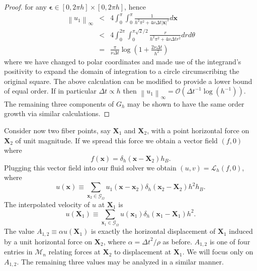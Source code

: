 \documentclass[preprint,12pt]{elsarticle}
\newcommand{\norm}[1]{\left\lVert#1\right\rVert}
\begin{document}
\begin{proof}
for any $\mathbf{\epsilon} \in [0,2\pi h]\times[0,2\pi h]$, hence 
\begin{eqnarray}
\norm{u_1}_\infty
&<&
4\int_0^{\pi}\int_0^{\pi}
\frac{1}{h^2\pi^2 + 4\nu\Delta t|\mathbf{x}|^2}
d\mathbf{x} \\
&<&
4\int_0^{2\pi}\int_0^{\pi\sqrt{2}/2}
\frac{r}{h^2\pi^2 + 4\nu\Delta t r^2}
drd\theta \\
&=&
\frac{\pi}{\nu\Delta t} \log\left( 1 + \frac{2\nu\Delta t}{h^2} \right)
\end{eqnarray}
where we have changed to polar coordinates and made use of the integrand's positivity to expand the domain of integration to a circle circumscribing the original square. The above calculation can be modified to provide a lower bound of equal order. If in particular $\Delta t \propto h$ then $\norm{u_1}_\infty = \mathcal{O}({\Delta t}^{-1}\log(h^{-1}))$.
The remaining three components of $G_h$ may be shown to have the same order growth via similar calculations.
\end{proof}


Consider now two fiber points, say $\mathbf{X}_1$ and $\mathbf{X}_2$, with a point horizontal force on $\mathbf{X}_2$ of unit magnitude. If we spread this force we obtain a vector field $(f,0)$ where
\begin{equation}
f(\mathbf{x}) = \delta_h(\mathbf{x} - \mathbf{X}_2)h_B.
\end{equation}
Plugging this vector field into our fluid solver we obtain $(u,v)=\mathcal{L}_h(f,0)$, where
\begin{equation}
u(\mathbf{x}) \equiv
\sum_{\mathbf{x}_2\in\mathcal{G}_\Omega}
u_1(\mathbf{x}-\mathbf{x}_2)\delta_h(\mathbf{x}_2-\mathbf{X}_2)h^2h_B.
\end{equation}
The interpolated velocity of $u$ at $\mathbf{X}_1$ is
\begin{equation}
u(\mathbf{X}_1) \equiv
\sum_{\mathbf{x}_1\in\mathcal{G}_\Omega}
u(\mathbf{x}_1)\delta_h(\mathbf{x}_1 - \mathbf{X}_1)h^2.
\end{equation}
The value $A_{1,2} \equiv \alpha u(\mathbf{X}_1)$ is exactly the horizontal displacement of $\mathbf{X}_1$ induced by a unit horizontal force on $\mathbf{X}_2$, where $\alpha = {\Delta t}^2/\rho$ as before. $A_{1,2}$ is one of four entries in $\mathcal{M}_n$ relating forces at $\mathbf{X}_2$ to displacement at $\mathbf{X}_1$. We will focus only on $A_{1,2}$. The remaining three values may be analyzed in a similar manner.
\end{document}
